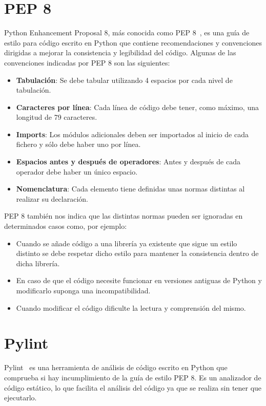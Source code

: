 \documentclass[a4paper, 12pt]{book}
\begin{document}
\section{PEP 8} 
\label{sec:pep8}
Python Enhancement Proposal 8, más conocida como PEP 8~\cite{pep8}, es una guía de estilo para código escrito en Python que contiene recomendaciones y convenciones dirigidas a mejorar la consistencia y legibilidad del código.
Algunas de las convenciones indicadas por PEP 8 son las siguientes:
\begin{itemize}
	\item \textbf{Tabulación}: Se debe tabular utilizando 4 espacios por cada nivel de tabulación.
	\item \textbf{Caracteres por línea}: Cada línea de código debe tener, como máximo, una longitud de 79 caracteres.
	\item \textbf{Imports}: Los módulos adicionales deben ser importados al inicio de cada fichero y sólo debe haber uno por línea.
	\item \textbf{Espacios antes y después de operadores}: Antes y después de cada operador debe haber un único espacio.
	\item \textbf{Nomenclatura}: Cada elemento tiene definidas unas normas distintas al realizar su declaración.
\end{itemize}

PEP 8 también nos indica que las distintas normas pueden ser ignoradas en determinados casos como, por ejemplo:
\begin{itemize}
	\item Cuando se añade código a una librería ya existente que sigue un estilo distinto se debe respetar dicho estilo para mantener la consistencia dentro de dicha librería.
	\item En caso de que el código necesite funcionar en versiones antiguas de Python y modificarlo suponga una incompatibilidad.
	\item Cuando modificar el código dificulte la lectura y comprensión del mismo. 
\end{itemize}

\section{Pylint} 
\label{sec:pylint}
Pylint~\cite{pylint} es una herramienta de análisis de código escrito en Python que comprueba si hay incumplimiento de la guía de estilo PEP 8. Es un analizador de código estático, lo que facilita el análisis del código ya que se realiza sin tener que ejecutarlo.
\end{document}
